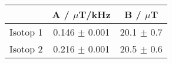 \begin{tabular}{ccc} \toprule 
\centering
 & A / $\mu$T/kHz  & B / $\mu$T \\ \midrule
Isotop 1 & 0.146 $\pm$ 0.001 & 20.1 $\pm$ 0.7 \\
Isotop 2 & 0.216 $\pm$ 0.001 & 20.5 $\pm$ 0.6 \\
\bottomrule
\end{tabular}

